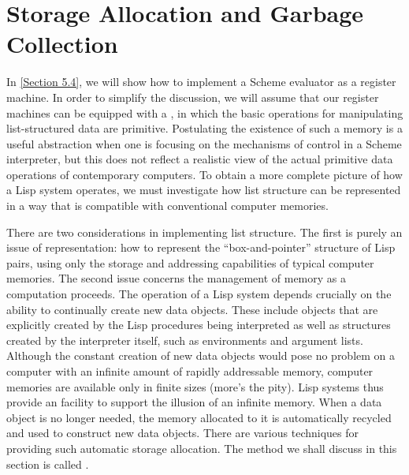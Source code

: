 \section{Storage Allocation and Garbage Collection}
\label{Section 5.3}

In \cref{Section 5.4}, we will show how to implement a Scheme evaluator as a register machine.
In order to simplify the discussion, we will assume that our register machines can be equipped with a , in which the basic operations for manipulating list-structured data are primitive.
Postulating the existence of such a memory is a useful abstraction when one is focusing on the mechanisms of control in a Scheme interpreter, but this does not reflect a realistic view of the actual primitive data operations of contemporary computers.
To obtain a more complete picture of how a Lisp system operates, we must investigate how list structure can be represented in a way that is compatible with conventional computer memories.

There are two considerations in implementing list structure.
The first is purely an issue of representation:
how to represent the “box-and-pointer” structure of Lisp pairs, using only the storage and addressing capabilities of typical computer memories.
The second issue concerns the management of memory as a computation proceeds.
The operation of a Lisp system depends crucially on the ability to continually create new data objects.
These include objects that are explicitly created by the Lisp procedures being interpreted as well as structures created by the interpreter itself, such as environments and argument lists.
Although the constant creation of new data objects would pose no problem on a computer with an infinite amount of rapidly addressable memory, computer memories are available only in finite sizes (more’s the pity).
Lisp systems thus provide an  facility to support the illusion of an infinite memory.
When a data object is no longer needed, the memory allocated to it is automatically recycled and used to construct new data objects.
There are various techniques for providing such automatic storage allocation.
The method we shall discuss in this section is called .




